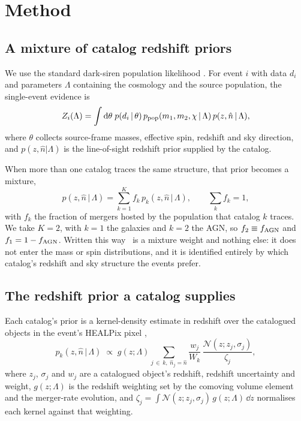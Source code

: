 \section{Method}
\label{sec:methods}

\subsection{A mixture of catalog redshift priors}
\label{sec:methods:mixture}

We use the standard dark-siren population likelihood
\citep{ChenFishbachHolz2018, MandelFarrGair2019, Gray2020}. For event $i$ with
data $d_i$ and parameters $\Lambda$ containing the cosmology and the source
population, the single-event evidence is
\begin{equation}
  Z_i(\Lambda) = \int \mathrm{d}\theta\; p(d_i \,|\, \theta)\,
                 p_{\rm pop}(m_1, m_2, \chi \,|\, \Lambda)\,
                 p(z, \hat{n} \,|\, \Lambda),
  \label{eq:zi}
\end{equation}
where $\theta$ collects source-frame masses, effective spin, redshift and sky
direction, and $p(z, \hat{n}|\Lambda)$ is the line-of-sight redshift prior
supplied by the catalog.

When more than one catalog traces the same structure, that prior becomes a
mixture,
\begin{equation}
  p(z, \hat{n} \,|\, \Lambda) = \sum_{k=1}^{K} f_k \,
      p_k(z, \hat{n} \,|\, \Lambda), \qquad \sum_k f_k = 1,
  \label{eq:mixture}
\end{equation}
with $f_k$ the fraction of mergers hosted by the population that catalog $k$
traces. We take $K = 2$, with $k = 1$ the galaxies and $k = 2$ the AGN, so
$f_2 \equiv f_{\rm AGN}$ and $f_1 = 1 - f_{\rm AGN}$. Written this way \fagn\ is a mixture
weight and nothing else: it does not enter the mass or spin distributions, and
it is identified entirely by which catalog's redshift and sky structure the
events prefer.

\subsection{The redshift prior a catalog supplies}
\label{sec:methods:prior}

Each catalog's prior is a kernel-density estimate in redshift over the
catalogued objects in the event's HEALPix pixel \citep{Gorski2005, Gray2022},
\begin{equation}
  p_k(z, \hat{n} \,|\, \Lambda) \;\propto\; g(z; \Lambda)
     \sum_{j \,\in\, k,\; \hat{n}_j = \hat{n}}
     \frac{w_j}{W_k}\,
     \frac{\mathcal{N}(z; z_j, \sigma_j)}{\zeta_j},
  \label{eq:pcat}
\end{equation}
where $z_j$, $\sigma_j$ and $w_j$ are a catalogued object's redshift, redshift
uncertainty and weight, $g(z;\Lambda)$ is the redshift weighting set by the
comoving volume element and the merger-rate evolution, and
$\zeta_j = \int \mathcal{N}(z; z_j, \sigma_j)\, g(z;\Lambda)\, \dd z$
normalises each kernel against that weighting.

